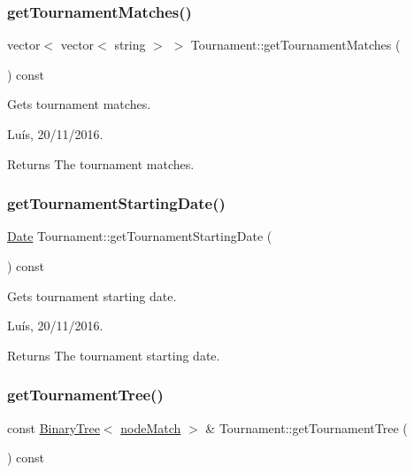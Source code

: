 \subsubsection{\texorpdfstring{get\+Tournament\+Matches()}{getTournamentMatches()}}
{\footnotesize\ttfamily vector$<$ vector$<$ string $>$ $>$ Tournament\+::get\+Tournament\+Matches (\begin{DoxyParamCaption}{ }\end{DoxyParamCaption}) const}



Gets tournament matches. 

Luís, 20/11/2016. 

\begin{DoxyReturn}{Returns}
The tournament matches. 
\end{DoxyReturn}
\hypertarget{class_tournament_a30bc0b9edbc862c7318d94199f6a94ee}{}\label{class_tournament_a30bc0b9edbc862c7318d94199f6a94ee} 
\subsubsection{\texorpdfstring{get\+Tournament\+Starting\+Date()}{getTournamentStartingDate()}}
{\footnotesize\ttfamily \hyperlink{class_date}{Date} Tournament\+::get\+Tournament\+Starting\+Date (\begin{DoxyParamCaption}{ }\end{DoxyParamCaption}) const}



Gets tournament starting date. 

Luís, 20/11/2016. 

\begin{DoxyReturn}{Returns}
The tournament starting date. 
\end{DoxyReturn}
\hypertarget{class_tournament_abeb767d12aab092bf94410e7224cf29b}{}\label{class_tournament_abeb767d12aab092bf94410e7224cf29b} 
\subsubsection{\texorpdfstring{get\+Tournament\+Tree()}{getTournamentTree()}}
{\footnotesize\ttfamily const \hyperlink{class_binary_tree}{Binary\+Tree}$<$ \hyperlink{_tournament_8hpp_a59a90f79e961bd9bc490adbf767f7cc4}{node\+Match} $>$ \& Tournament\+::get\+Tournament\+Tree (\begin{DoxyParamCaption}{ }\end{DoxyParamCaption}) const}



